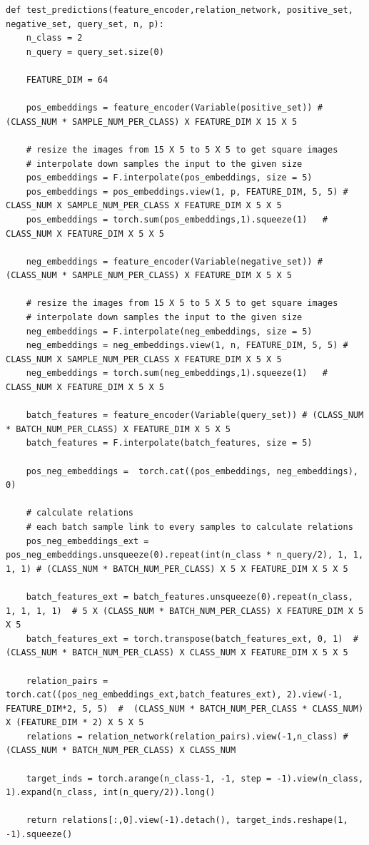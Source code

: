 \documentclass[12pt,a4paper,titlepage]{article}
\begin{document}
\begin{lstlisting}[language=iPython,firstnumber=1, caption=Funzione \texttt{test\_predictions}, label=test_predictions_relation,captionpos=b]
def test_predictions(feature_encoder,relation_network, positive_set, negative_set, query_set, n, p):
    n_class = 2
    n_query = query_set.size(0)

    FEATURE_DIM = 64

    pos_embeddings = feature_encoder(Variable(positive_set)) # (CLASS_NUM * SAMPLE_NUM_PER_CLASS) X FEATURE_DIM X 15 X 5

    # resize the images from 15 X 5 to 5 X 5 to get square images
    # interpolate down samples the input to the given size
    pos_embeddings = F.interpolate(pos_embeddings, size = 5)
    pos_embeddings = pos_embeddings.view(1, p, FEATURE_DIM, 5, 5) # CLASS_NUM X SAMPLE_NUM_PER_CLASS X FEATURE_DIM X 5 X 5
    pos_embeddings = torch.sum(pos_embeddings,1).squeeze(1)   # CLASS_NUM X FEATURE_DIM X 5 X 5

    neg_embeddings = feature_encoder(Variable(negative_set)) # (CLASS_NUM * SAMPLE_NUM_PER_CLASS) X FEATURE_DIM X 5 X 5

    # resize the images from 15 X 5 to 5 X 5 to get square images
    # interpolate down samples the input to the given size
    neg_embeddings = F.interpolate(neg_embeddings, size = 5)
    neg_embeddings = neg_embeddings.view(1, n, FEATURE_DIM, 5, 5) # CLASS_NUM X SAMPLE_NUM_PER_CLASS X FEATURE_DIM X 5 X 5
    neg_embeddings = torch.sum(neg_embeddings,1).squeeze(1)   # CLASS_NUM X FEATURE_DIM X 5 X 5
    
    batch_features = feature_encoder(Variable(query_set)) # (CLASS_NUM * BATCH_NUM_PER_CLASS) X FEATURE_DIM X 5 X 5
    batch_features = F.interpolate(batch_features, size = 5)
    
    pos_neg_embeddings =  torch.cat((pos_embeddings, neg_embeddings), 0)

    # calculate relations
    # each batch sample link to every samples to calculate relations
    pos_neg_embeddings_ext = pos_neg_embeddings.unsqueeze(0).repeat(int(n_class * n_query/2), 1, 1, 1, 1) # (CLASS_NUM * BATCH_NUM_PER_CLASS) X 5 X FEATURE_DIM X 5 X 5
    
    batch_features_ext = batch_features.unsqueeze(0).repeat(n_class, 1, 1, 1, 1)  # 5 X (CLASS_NUM * BATCH_NUM_PER_CLASS) X FEATURE_DIM X 5 X 5
    batch_features_ext = torch.transpose(batch_features_ext, 0, 1)  #  (CLASS_NUM * BATCH_NUM_PER_CLASS) X CLASS_NUM X FEATURE_DIM X 5 X 5

    relation_pairs = torch.cat((pos_neg_embeddings_ext,batch_features_ext), 2).view(-1, FEATURE_DIM*2, 5, 5)  #  (CLASS_NUM * BATCH_NUM_PER_CLASS * CLASS_NUM) X (FEATURE_DIM * 2) X 5 X 5
    relations = relation_network(relation_pairs).view(-1,n_class) #  (CLASS_NUM * BATCH_NUM_PER_CLASS) X CLASS_NUM
    
    target_inds = torch.arange(n_class-1, -1, step = -1).view(n_class, 1).expand(n_class, int(n_query/2)).long()
    
    return relations[:,0].view(-1).detach(), target_inds.reshape(1, -1).squeeze()
\end{lstlisting}
\end{document}
